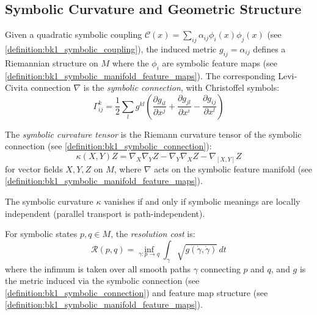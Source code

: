 \subsection{Symbolic Curvature and Geometric Structure}
\label{subsec:bk1_symbolic_curvature_and_geometric_structure}

\begin{definition}
\label{definition:bk1_symbolic_connection}
Given a quadratic symbolic coupling $\mathcal{C}(x) = \sum_{ij} \alpha_{ij} \phi_i(x)\phi_j(x)$ (see \ref{definition:bk1_symbolic_coupling}), the induced metric $g_{ij} = \alpha_{ij}$ defines a Riemannian structure on $M$ where the $\phi_i$ are symbolic feature maps (see \ref{definition:bk1_symbolic_manifold_feature_maps}). The corresponding Levi-Civita connection $\nabla$ is the \emph{symbolic connection}, with Christoffel symbols:
\[
\Gamma^k_{ij} = \frac{1}{2} \sum_l g^{kl} \left( \frac{\partial g_{il}}{\partial x^j} + \frac{\partial g_{jl}}{\partial x^i} - \frac{\partial g_{ij}}{\partial x^l} \right)
\]
\end{definition}

\begin{definition}
\label{definition:bk1_symbolic_riemann_tensor}
The \emph{symbolic curvature tensor} is the Riemann curvature tensor of the symbolic connection (see \ref{definition:bk1_symbolic_connection}):
\[
\kappa(X,Y)Z = \nabla_X \nabla_Y Z - \nabla_Y \nabla_X Z - \nabla_{[X,Y]} Z
\]
for vector fields $X, Y, Z$ on $M$, where $\nabla$ acts on the symbolic feature manifold (see \ref{definition:bk1_symbolic_manifold_feature_maps}).
\end{definition}

\begin{proposition}
\label{proposition:bk1_curvature_semantic_entanglement}
The symbolic curvature $\kappa$ vanishes if and only if symbolic meanings are locally independent (parallel transport is path-independent).
\end{proposition}

\begin{definition}
\label{definition:bk1_resolution_cost}
For symbolic states $p, q \in M$, the \emph{resolution cost} is:
\[
\mathcal{R}(p,q) = \inf_{\gamma: p \to q} \int_\gamma \sqrt{g(\dot{\gamma}, \dot{\gamma})} \, dt
\]
where the infimum is taken over all smooth paths $\gamma$ connecting $p$ and $q$, and $g$ is the metric induced via the symbolic connection (see \ref{definition:bk1_symbolic_connection}) and feature map structure (see \ref{definition:bk1_symbolic_manifold_feature_maps}).
\end{definition}

